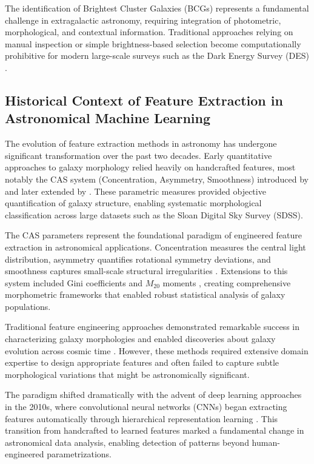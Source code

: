 \documentclass[twocolumn,10pt]{aastex631}
\begin{document}
The identification of Brightest Cluster Galaxies (BCGs) represents a fundamental challenge in extragalactic astronomy, requiring integration of photometric, morphological, and contextual information. Traditional approaches relying on manual inspection or simple brightness-based selection become computationally prohibitive for modern large-scale surveys such as the Dark Energy Survey (DES) \citep{Rykoff2016}.

\subsection{Historical Context of Feature Extraction in Astronomical Machine Learning}

The evolution of feature extraction methods in astronomy has undergone significant transformation over the past two decades. Early quantitative approaches to galaxy morphology relied heavily on handcrafted features, most notably the CAS system (Concentration, Asymmetry, Smoothness) introduced by \citet{Abraham1996} and later extended by \citet{Conselice2003}. These parametric measures provided objective quantification of galaxy structure, enabling systematic morphological classification across large datasets such as the Sloan Digital Sky Survey (SDSS).

The CAS parameters represent the foundational paradigm of engineered feature extraction in astronomical applications. Concentration measures the central light distribution, asymmetry quantifies rotational symmetry deviations, and smoothness captures small-scale structural irregularities \citep{Conselice2003}. Extensions to this system included Gini coefficients and $M_{20}$ moments \citep{Hambleton2011}, creating comprehensive morphometric frameworks that enabled robust statistical analysis of galaxy populations.

Traditional feature engineering approaches demonstrated remarkable success in characterizing galaxy morphologies and enabled discoveries about galaxy evolution across cosmic time \citep{Conselice2014}. However, these methods required extensive domain expertise to design appropriate features and often failed to capture subtle morphological variations that might be astronomically significant.

The paradigm shifted dramatically with the advent of deep learning approaches in the 2010s, where convolutional neural networks (CNNs) began extracting features automatically through hierarchical representation learning \citep{Dieleman2015}. This transition from handcrafted to learned features marked a fundamental change in astronomical data analysis, enabling detection of patterns beyond human-engineered parametrizations.
\end{document}
